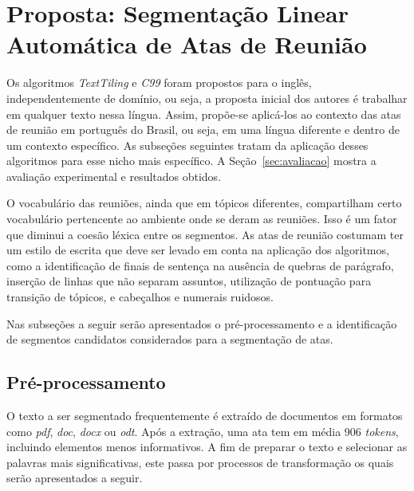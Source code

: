 \section{Proposta: Segmentação Linear Automática de Atas de Reunião}
	\label{sec:proposta}






Os algoritmos \textit{TextTiling} e \textit{C99} foram propostos para o inglês, independentemente de domínio, ou seja, a proposta inicial dos autores é trabalhar em qualquer texto nessa língua.
Assim, propõe-se aplicá-los ao contexto das atas de reunião em português do Brasil, ou seja, em uma língua diferente e dentro de um contexto específico. As subseções seguintes tratam da aplicação desses algoritmos para esse nicho mais específico. A Seção~\ref{sec:avaliacao} mostra a avaliação experimental e resultados obtidos.

O vocabulário das reuniões, ainda que em tópicos diferentes, compartilham certo vocabulário pertencente ao ambiente onde se deram as reuniões. Isso é um fator que diminui a coesão léxica entre os segmentos.
As atas de reunião costumam ter um estilo de escrita que deve ser levado em conta na aplicação dos algoritmos, como a identificação de finais de sentença na ausência de quebras de parágrafo, inserção de linhas que não separam assuntos, utilização de pontuação para transição de tópicos, e cabeçalhos e numerais ruidosos. 

Nas subseções a seguir serão apresentados o pré-processamento e a identificação de segmentos candidatos considerados para a segmentação de atas.





\subsection{Pré-processamento}
	\label{subsec:preprocessamento}

	O texto a ser segmentado frequentemente é extraído de documentos em formatos como \textit{pdf}, \textit{doc}, \textit{docx} ou \textit{odt}. Após a extração, uma ata tem em média 906 \textit{tokens}, incluindo elementos menos informativos. 
A fim de preparar o texto e selecionar as palavras mais significativas, este passa por processos de transformação os quais serão apresentados a seguir.
	

